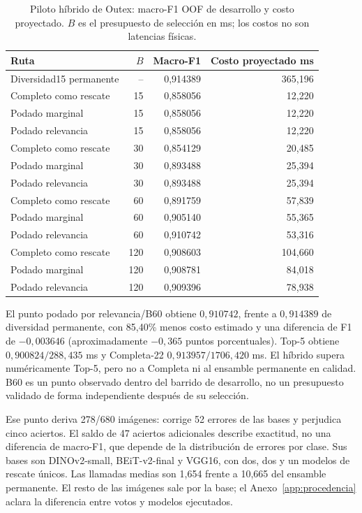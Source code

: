 \begin{table}[!htbp]
\centering\small
\caption{Piloto híbrido de Outex: macro-F1 OOF de desarrollo y costo proyectado. $B$ es el presupuesto de selección en ms; los costos no son latencias físicas.}
\label{tab:hybrid-oof}
\begin{tabular}{@{}lrrr@{}}
\toprule
Ruta & $B$ & Macro-F1 & Costo proyectado ms\\
\midrule
Diversidad15 permanente & -- & 0,914389 & 365,196\\
Completo como rescate & 15 & 0,858056 & 12,220\\
Podado marginal & 15 & 0,858056 & 12,220\\
Podado relevancia & 15 & 0,858056 & 12,220\\
Completo como rescate & 30 & 0,854129 & 20,485\\
Podado marginal & 30 & 0,893488 & 25,394\\
Podado relevancia & 30 & 0,893488 & 25,394\\
Completo como rescate & 60 & 0,891759 & 57,839\\
Podado marginal & 60 & 0,905140 & 55,365\\
Podado relevancia & 60 & 0,910742 & 53,316\\
Completo como rescate & 120 & 0,908603 & 104,660\\
Podado marginal & 120 & 0,908781 & 84,018\\
Podado relevancia & 120 & 0,909396 & 78,938\\
\bottomrule
\end{tabular}
\end{table}

El punto podado por relevancia/B60 obtiene $0{,}910742$, frente a $0{,}914389$ de diversidad permanente, con 85,40\% menos costo estimado y una diferencia de F1 de $-0{,}003646$ (aproximadamente $-0{,}365$ puntos porcentuales). Top-5 obtiene $0{,}900824/288{,}435$ ms y Completa-22 $0{,}913957/1706{,}420$ ms. El híbrido supera numéricamente Top-5, pero no a Completa ni al ensamble permanente en calidad. B60 es un punto observado dentro del barrido de desarrollo, no un presupuesto validado de forma independiente después de su selección.

Ese punto deriva 278/680 imágenes: corrige 52 errores de las bases y perjudica cinco aciertos. El saldo de 47 aciertos adicionales describe exactitud, no una diferencia de macro-F1, que depende de la distribución de errores por clase. Sus bases son DINOv2-small, BEiT-v2-final y VGG16, con dos, dos y un modelos de rescate únicos. Las llamadas medias son 1,654 frente a 10,665 del ensamble permanente. El resto de las imágenes sale por la base; el Anexo~\ref{app:procedencia} aclara la diferencia entre votos y modelos ejecutados.


